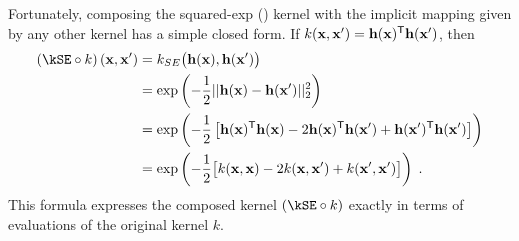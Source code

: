 Fortunately, composing the squared-exp (\kSE{}) kernel with the implicit mapping given by any other kernel has a simple closed form.
If $k({\bf{x}}, {\bf{x}}') = {\bf{h}}({\bf{x}})^{\mathsf{T}} {\bf{h}}({\bf{x}}')$, then
%
\begin{align}
\left( \kSE \circ k \right) \left( \vx, \vx' \right) & = k_{SE} \big( \hPhi(\vx), \hPhi(\vx') \big) \\
& = \exp \left( -\frac{1}{2} || \hPhi(\vx) - \hPhi(\vx')||_2^2 \right) \\
& = \exp\left ( -\frac{1}{2} \left[ \hPhi(\vx) \tra \hPhi(\vx) - 2 \hPhi(\vx) \tra \hPhi(\vx') + \hPhi(\vx') \tra \hPhi(\vx') \right] \right)  \\
& = \exp \left( -\frac{1}{2} \big[ k(\vx, \vx) - 2 k(\vx, \vx') + k(\vx', \vx') \big] \right) \; .
\end{align}
%
%
%
This formula expresses the composed kernel $(\kSE \circ k)$ exactly in terms of evaluations of the original kernel $k$.

